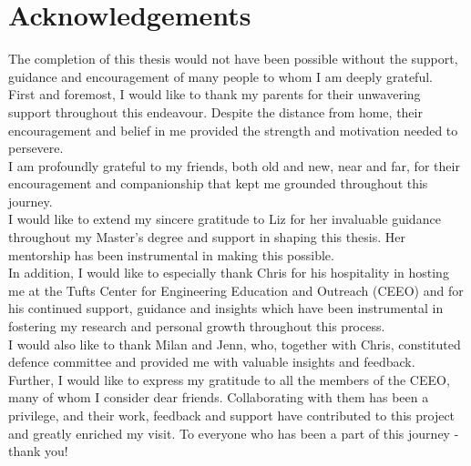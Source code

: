 \chapter*{Acknowledgements}%
%
%

The completion of this thesis would not have been possible without the support, guidance and encouragement of many people to whom I am deeply grateful.\\

First and foremost, I would like to thank my parents for their unwavering support throughout this endeavour. Despite the distance from home, their encouragement and belief in me provided the strength and motivation needed to persevere.\\

I am profoundly grateful to my friends, both old and new, near and far, for their encouragement and companionship that kept me grounded throughout this journey. \\

I would like to extend my sincere gratitude to Liz for her invaluable guidance throughout my Master's degree and support in shaping this thesis. Her mentorship has been instrumental in making this possible. \\

In addition, I would like to especially thank Chris for his hospitality in hosting me at the Tufts Center for Engineering Education and Outreach (CEEO) and for his continued support, guidance and insights which have been instrumental in fostering my research and personal growth throughout this process. \\

I would also like to thank Milan and Jenn, who, together with Chris, constituted defence committee and provided me with valuable insights and feedback. \\

Further, I would like to express my gratitude to all the members of the CEEO, many of whom I consider dear friends. Collaborating with them has been a privilege, and their work, feedback and support have contributed to this project and greatly enriched my visit. To everyone who has been a part of this journey - thank you!